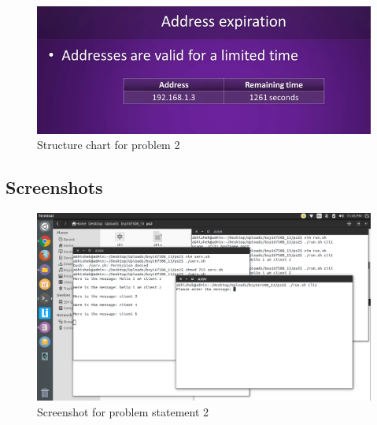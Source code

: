 \documentclass[11pt]{report}
\begin{document}
	\pagebreak
	\begin{figure}[h!]
	\centering
	\includegraphics[scale=0.7]{images/sc24}
	\caption{Structure chart for problem 2 }	
	\end{figure}
	\pagebreak
\subsection{Screenshots}
	\begin{figure}[h!]
	\centering
	\includegraphics[scale=0.8, center]{images/screenshot21}
	\caption{Screenshot for problem statement 2}
	\end{figure}
	\pagebreak
\end{document}
